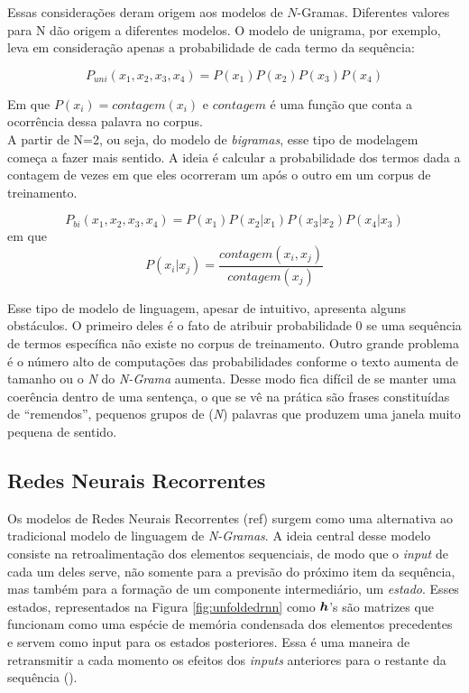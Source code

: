 Essas considerações deram origem aos modelos de $N$-Gramas. Diferentes valores para N dão origem a diferentes modelos. O modelo de unigrama, por exemplo, leva em consideração apenas a probabilidade de cada termo da sequência:

\begin{equation}
P_{uni}(x_1, x_2, x_3, x_4) = P(x_1)P(x_2)P(x_3)P(x_4)
\end{equation}

Em que $P(x_i) = contagem(x_i)$ e $contagem$ é uma função que conta a ocorrência dessa palavra no corpus.\\

A partir de N=2, ou seja, do modelo de \textit{bigramas}, esse tipo de modelagem começa a fazer mais sentido. A ideia é calcular a probabilidade dos termos dada a contagem de vezes em que eles ocorreram um após o outro em um corpus de treinamento.

\begin{equation}
P_{bi}(x_1,x_2,x_3,x_4) = P(x_1)P(x_2\vert x_1)P(x_3\vert x_2)P(x_4\vert x_3)
\end{equation} 
em que
\begin{equation}
P(x_i\vert x_j) = \frac{contagem(x_i, x_j)}{contagem(x_j)}
\end{equation}


Esse tipo de modelo de linguagem, apesar de intuitivo, apresenta alguns obstáculos. O primeiro deles é o fato de atribuir probabilidade 0 se uma sequência de termos específica não existe no corpus de treinamento. Outro grande problema é o número alto de computações das probabilidades conforme o texto aumenta de tamanho ou o \textit{N} do \textit{N-Grama} aumenta. Desse modo fica difícil de se manter uma coerência dentro de uma sentença, o que se vê na prática são frases constituídas de “remendos”, pequenos grupos de (\textit{N}) palavras que produzem uma janela muito pequena de sentido.

\subsection{Redes Neurais Recorrentes}
\label{sec:RNN}

Os modelos de Redes Neurais Recorrentes (ref) surgem como uma alternativa ao tradicional modelo de linguagem de \textit{N-Gramas}. A ideia central desse modelo consiste na retroalimentação dos elementos sequenciais, de modo que o \textit{input} de cada um deles serve, não somente para a previsão do próximo item da sequência, mas também para a formação de um componente intermediário, um \textit{estado}. Esses estados, representados na Figura \ref{fig:unfoldedrnn} como $\bm{h}$'s são matrizes que funcionam como uma espécie de memória condensada dos elementos precedentes e servem como input para os estados posteriores. Essa é uma maneira de retransmitir a cada momento os efeitos dos \textit{inputs} anteriores para o restante da sequência (\cite{Goodfellow-et-al-2016}). 

